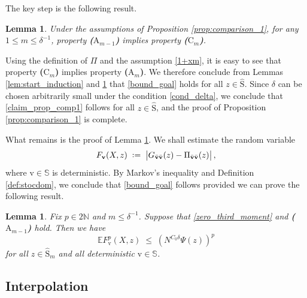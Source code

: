 \documentclass[11pt]{article} %
\numberwithin{equation}{section}
\numberwithin{figure}{section}
\theoremstyle{plain} %
\newtheorem{lemma}[theorem]{Lemma}
\theoremstyle{definition} %
\newcommand{\f}[1]{\boldsymbol{\mathrm{#1}}} %
\newcommand{\bb}{\mathbb} %
\newcommand{\wh}{\widehat}
\newcommand{\E}{\mathbb{E}}
\newcommand{\N}{\mathbb{N}}
\newcommand*{\deq}{\mathrel{\vcenter{\baselineskip0.65ex \lineskiplimit0pt \hbox{.}\hbox{.}}}=}
\renewcommand{\leq}{\leqslant}
\newcommand{\absb}[1]{\bigl\lvert #1 \bigr\rvert}
\begin{document}
The key step is the following result.

\begin{lemma} \label{lem:induction}
Under the assumptions of Proposition \ref{prop:comparison_1}, for any $1 \leq m \leq \delta^{-1}$, property \textbf{($\f A_{m - 1}$)} implies property \textbf{($\f C_m$)}.
\end{lemma}

Using the definition of $\Pi$ and the assumption \eqref{1+xm}, it is easy to see that property \textbf{($\f C_m$)} implies property \textbf{($\f A_m$)}. We therefore conclude from Lemmas \ref{lem:start_induction} and \ref{lem:induction} that \eqref{bound_goal} holds for all $z \in \wh{\f S}$. Since $\delta$ can be chosen arbitrarily small under the condition \eqref{cond_delta}, we conclude that \eqref{claim_prop_comp1} follows for all $z \in \wh{\f S}$, and the proof of Proposition \ref{prop:comparison_1} is complete.

What remains is the proof of Lemma \ref{lem:induction}.
We shall estimate the random variable
\begin{equation} \label{def_Fp}
F_{\f v}(X, z) \;\deq\; \absb{G_{\bar{\f v} \bar{\f v}}(z) - \Pi_{\bar{\f v} \bar{\f v}}(z)}\,,
\end{equation}
where $\f v \in \bb S$ is deterministic.
By Markov's inequality and Definition \ref{def:stocdom}, we conclude that \eqref{bound_goal} follows provided we can prove the following result.
\begin{lemma} \label{lem:moment_bound_1}
Fix $p \in 2 \N$ and $m \leq \delta^{-1}$. Suppose that \eqref{zero_third_moment} and \textbf{($\f A_{m - 1}$)} hold. Then we have
\begin{equation*}
\E F_{\f v}^p(X,z) \;\leq\; (N^{C_0 \delta}\Psi(z))^p
\end{equation*}
for all $z \in \wh{\f S}_m$ and all deterministic $\f v \in \bb S$.
\end{lemma}










\subsection{Interpolation} \label{sec:interpolation}
\end{document}
